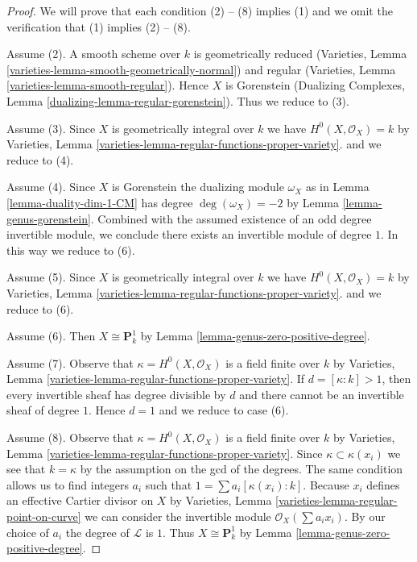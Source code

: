 \begin{proof}
We will prove that each condition (2) -- (8) implies (1) and we omit
the verification that (1) implies (2) -- (8).

\medskip\noindent
Assume (2). A smooth scheme over $k$ is geometrically reduced
(Varieties, Lemma \ref{varieties-lemma-smooth-geometrically-normal})
and regular (Varieties, Lemma \ref{varieties-lemma-smooth-regular}).
Hence $X$ is Gorenstein (Dualizing Complexes, Lemma
\ref{dualizing-lemma-regular-gorenstein}).
Thus we reduce to (3).

\medskip\noindent
Assume (3). Since $X$ is geometrically integral over $k$ we have
$H^0(X, \mathcal{O}_X) = k$ by
Varieties, Lemma \ref{varieties-lemma-regular-functions-proper-variety}.
and we reduce to (4).

\medskip\noindent
Assume (4). Since $X$ is Gorenstein the dualizing module
$\omega_X$ as in Lemma \ref{lemma-duality-dim-1-CM} has degree
$\deg(\omega_X) = -2$ by Lemma \ref{lemma-genus-gorenstein}.
Combined with the assumed existence of an odd degree invertible
module, we conclude there exists an invertible module of degree $1$.
In this way we reduce to (6).

\medskip\noindent
Assume (5). Since $X$ is geometrically integral over $k$ we have
$H^0(X, \mathcal{O}_X) = k$ by
Varieties, Lemma \ref{varieties-lemma-regular-functions-proper-variety}.
and we reduce to (6).

\medskip\noindent
Assume (6). Then $X \cong \mathbf{P}^1_k$ by
Lemma \ref{lemma-genus-zero-positive-degree}.

\medskip\noindent
Assume (7). Observe that $\kappa = H^0(X, \mathcal{O}_X)$ is a field
finite over $k$ by
Varieties, Lemma \ref{varieties-lemma-regular-functions-proper-variety}.
If $d = [\kappa : k] > 1$, then every invertible sheaf has degree
divisible by $d$ and there cannot be an invertible sheaf of degree $1$.
Hence $d = 1$ and we reduce to case (6).

\medskip\noindent
Assume (8). Observe that $\kappa = H^0(X, \mathcal{O}_X)$ is a field
finite over $k$ by
Varieties, Lemma \ref{varieties-lemma-regular-functions-proper-variety}.
Since $\kappa \subset \kappa(x_i)$ we see that $k = \kappa$
by the assumption on the gcd of the degrees. The same condition
allows us to find integers $a_i$ such that
$1 = \sum a_i[\kappa(x_i) : k]$. Because $x_i$ defines an
effective Cartier divisor on $X$ by
Varieties, Lemma \ref{varieties-lemma-regular-point-on-curve}
we can consider the invertible module $\mathcal{O}_X(\sum a_i x_i)$.
By our choice of $a_i$ the degree of $\mathcal{L}$ is $1$.
Thus $X \cong \mathbf{P}^1_k$ by Lemma \ref{lemma-genus-zero-positive-degree}.
\end{proof}

